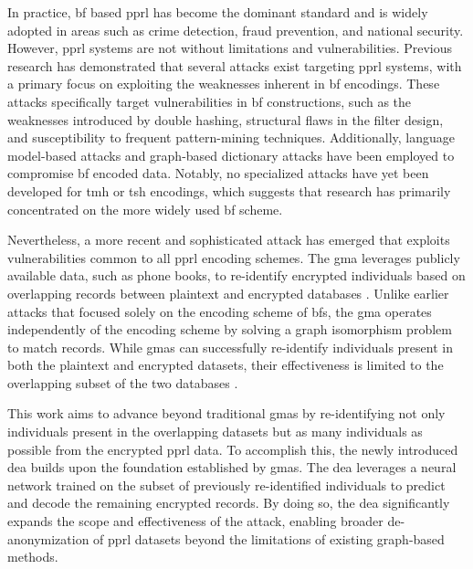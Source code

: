 In practice, \ac{bf} based \ac{pprl} has become the dominant standard and is widely adopted in areas such as crime detection, fraud prevention, and national security. 
However, \ac{pprl} systems are not without limitations and vulnerabilities. 
Previous research has demonstrated that several attacks exist targeting \ac{pprl} systems, with a primary focus on exploiting the weaknesses inherent in \ac{bf} encodings.
These attacks specifically target vulnerabilities in \ac{bf} constructions, such as the weaknesses introduced by double hashing, structural flaws in the filter design, and susceptibility to frequent pattern-mining techniques. 
Additionally, language model-based attacks and graph-based dictionary attacks have been employed to compromise \ac{bf} encoded data. 
Notably, no specialized attacks have yet been developed for \ac{tmh} or \ac{tsh} encodings, which suggests that research has primarily concentrated on the more widely used \ac{bf} scheme. \cite{vidanage2020graph}

Nevertheless, a more recent and sophisticated attack has emerged that exploits vulnerabilities common to all \ac{pprl} encoding schemes. 
The \ac{gma} leverages publicly available data, such as phone books, to re-identify encrypted individuals based on overlapping records between plaintext and encrypted databases \cite{vidanage2020graph, schaefer2024}. 
Unlike earlier attacks that focused solely on the encoding scheme of \ac{bf}s, the \ac{gma} operates independently of the encoding scheme by solving a graph isomorphism problem to match records. 
While \ac{gma}s can successfully re-identify individuals present in both the plaintext and encrypted datasets, their effectiveness is limited to the overlapping subset of the two databases \cite{schaefer2024}.

This work aims to advance beyond traditional \ac{gma}s by re-identifying not only individuals present in the overlapping datasets but as many individuals as possible from the encrypted \ac{pprl} data. 
To accomplish this, the newly introduced \ac{dea} builds upon the foundation established by \ac{gma}s. 
The \ac{dea} leverages a neural network trained on the subset of previously re-identified individuals to predict and decode the remaining encrypted records. 
By doing so, the \ac{dea} significantly expands the scope and effectiveness of the attack, enabling broader de-anonymization of \ac{pprl} datasets beyond the limitations of existing graph-based methods.


